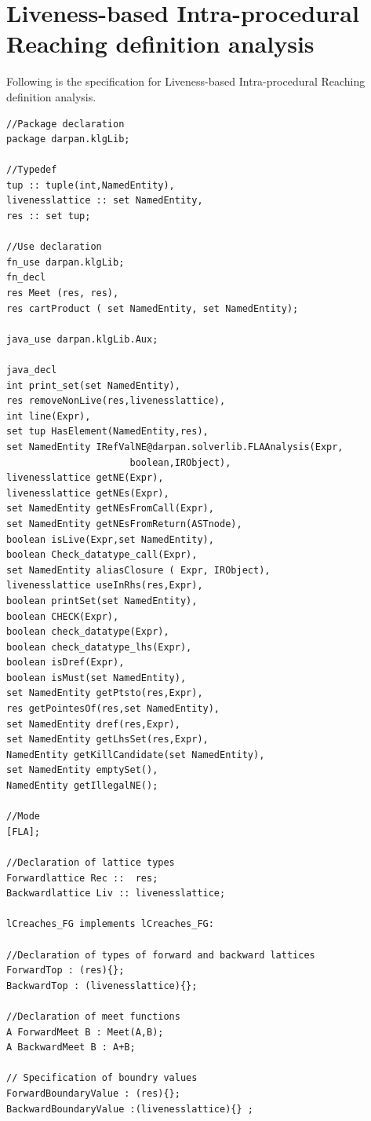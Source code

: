 \documentclass[11pt,a4paper,openright]{report}
\begin{document}
\section{Liveness-based Intra-procedural Reaching definition analysis}
Following is the specification for Liveness-based Intra-procedural Reaching definition analysis.
\begin{lstlisting}
//Package declaration
package darpan.klgLib;

//Typedef
tup :: tuple(int,NamedEntity),
livenesslattice :: set NamedEntity,
res :: set tup;

//Use declaration
fn_use darpan.klgLib;
fn_decl
res Meet (res, res),
res cartProduct ( set NamedEntity, set NamedEntity);

java_use darpan.klgLib.Aux;

java_decl
int print_set(set NamedEntity),
res removeNonLive(res,livenesslattice),
int line(Expr),
set tup HasElement(NamedEntity,res),
set NamedEntity IRefValNE@darpan.solverlib.FLAAnalysis(Expr,
					  boolean,IRObject),
livenesslattice getNE(Expr),
livenesslattice getNEs(Expr),
set NamedEntity getNEsFromCall(Expr),
set NamedEntity getNEsFromReturn(ASTnode),
boolean isLive(Expr,set NamedEntity),
boolean Check_datatype_call(Expr),
set NamedEntity aliasClosure ( Expr, IRObject),
livenesslattice useInRhs(res,Expr),
boolean printSet(set NamedEntity),
boolean CHECK(Expr),
boolean check_datatype(Expr),
boolean check_datatype_lhs(Expr),
boolean isDref(Expr),
boolean isMust(set NamedEntity),
set NamedEntity getPtsto(res,Expr),
res getPointesOf(res,set NamedEntity),
set NamedEntity dref(res,Expr),
set NamedEntity getLhsSet(res,Expr),
NamedEntity getKillCandidate(set NamedEntity),
set NamedEntity emptySet(),
NamedEntity getIllegalNE();

//Mode
[FLA];

//Declaration of lattice types
Forwardlattice Rec ::  res;
Backwardlattice Liv :: livenesslattice;

lCreaches_FG implements lCreaches_FG:

//Declaration of types of forward and backward lattices
ForwardTop : (res){};
BackwardTop : (livenesslattice){};

//Declaration of meet functions
A ForwardMeet B : Meet(A,B);
A BackwardMeet B : A+B;

// Specification of boundry values
ForwardBoundaryValue : (res){};
BackwardBoundaryValue :(livenesslattice){} ;


\end{lstlisting}
\end{document}
